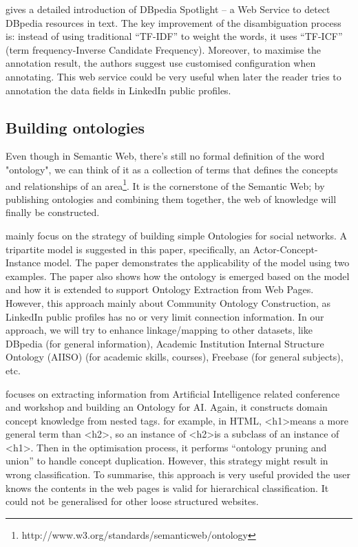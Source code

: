 \cite{mendes2011} gives a detailed introduction of DBpedia Spotlight -- a Web Service to detect DBpedia resources in text. The key improvement of the disambiguation process is: instead of using traditional ``TF-IDF'' to weight the words, it uses ``TF-ICF'' (term frequency-Inverse Candidate Frequency). Moreover, to maximise the annotation result, the authors suggest use customised configuration when annotating. This web service could be very useful when later the reader tries to annotation the data fields in LinkedIn public profiles.

\subsection{Building ontologies}

Even though in Semantic Web, there's still no formal definition of the word "ontology", we can think of it as a collection of terms that  defines the concepts and relationships of an area\footnote{http://www.w3.org/standards/semanticweb/ontology}. It is the cornerstone of the Semantic Web; by publishing ontologies and combining them together, the web of knowledge will finally be constructed. 

\cite{mika2007} mainly focus on the strategy of building simple Ontologies for social networks. A tripartite model is suggested in this paper, specifically, an Actor-Concept-Instance model. The paper demonstrates the applicability of the model using two examples. The paper also shows how the ontology is emerged based on the model and how it is extended to support Ontology Extraction from Web Pages. However, this approach mainly about Community Ontology Construction, as LinkedIn public profiles has no or very limit connection information. In our approach, we will try to enhance linkage/mapping to other datasets, like DBpedia (for general information), Academic Institution Internal Structure Ontology (AIISO) (for academic skills, courses), Freebase (for general subjects), etc.

\cite{wang2011} focuses on extracting information from Artificial Intelligence related conference and workshop and building an Ontology for AI. Again, it constructs domain concept knowledge from nested tags. for example, in HTML, \textless h1\textgreater means a more general term than \textless h2\textgreater, so an instance of \textless h2\textgreater is a subclass of an instance of \textless h1\textgreater. Then in the optimisation process, it performs ``ontology pruning and union'' to handle concept duplication. However, this strategy might result in wrong classification. To summarise, this approach is very useful provided the user knows the contents in the web pages is valid for hierarchical classification. It could not be generalised for other loose structured websites.

